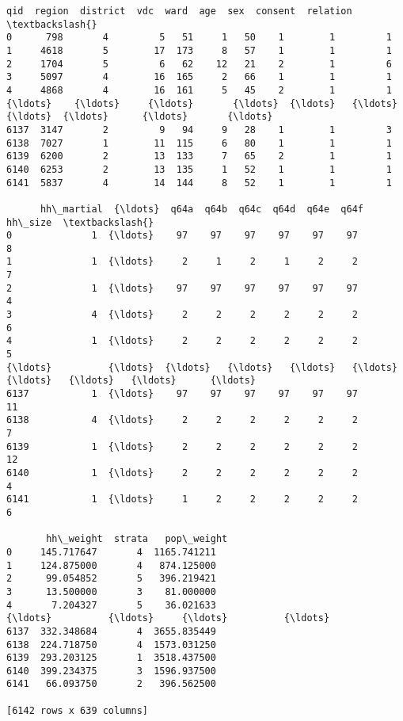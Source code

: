 \documentclass[11pt]{article}
\makeatletter
\newcommand{\boxspacing}{\kern\kvtcb@left@rule\kern\kvtcb@boxsep}
\newcommand{\prompt}[4]{
        {\ttfamily\llap{{\color{#2}[#3]:\hspace{3pt}#4}}\vspace{-\baselineskip}}
    }
\makeatother
\begin{document}
            \begin{tcolorbox}[breakable, size=fbox, boxrule=.5pt, pad at break*=1mm, opacityfill=0]
\prompt{Out}{outcolor}{3}{\boxspacing}
\begin{Verbatim}[commandchars=\\\{\}]
       qid  region  district  vdc  ward  age  sex  consent  relation  \textbackslash{}
0      798       4         5   51     1   50    1        1         1
1     4618       5        17  173     8   57    1        1         1
2     1704       5         6   62    12   21    2        1         6
3     5097       4        16  165     2   66    1        1         1
4     4868       4        16  161     5   45    2        1         1
{\ldots}    {\ldots}     {\ldots}       {\ldots}  {\ldots}   {\ldots}  {\ldots}  {\ldots}      {\ldots}       {\ldots}
6137  3147       2         9   94     9   28    1        1         3
6138  7027       1        11  115     6   80    1        1         1
6139  6200       2        13  133     7   65    2        1         1
6140  6253       2        13  135     1   52    1        1         1
6141  5837       4        14  144     8   52    1        1         1

      hh\_martial  {\ldots}  q64a  q64b  q64c  q64d  q64e  q64f  hh\_size  \textbackslash{}
0              1  {\ldots}    97    97    97    97    97    97        8
1              1  {\ldots}     2     1     2     1     2     2        7
2              1  {\ldots}    97    97    97    97    97    97        4
3              4  {\ldots}     2     2     2     2     2     2        6
4              1  {\ldots}     2     2     2     2     2     2        5
{\ldots}          {\ldots}  {\ldots}   {\ldots}   {\ldots}   {\ldots}   {\ldots}   {\ldots}   {\ldots}      {\ldots}
6137           1  {\ldots}    97    97    97    97    97    97       11
6138           4  {\ldots}     2     2     2     2     2     2        7
6139           1  {\ldots}     2     2     2     2     2     2       12
6140           1  {\ldots}     2     2     2     2     2     2        4
6141           1  {\ldots}     1     2     2     2     2     2        6

       hh\_weight  strata   pop\_weight
0     145.717647       4  1165.741211
1     124.875000       4   874.125000
2      99.054852       5   396.219421
3      13.500000       3    81.000000
4       7.204327       5    36.021633
{\ldots}          {\ldots}     {\ldots}          {\ldots}
6137  332.348684       4  3655.835449
6138  224.718750       4  1573.031250
6139  293.203125       1  3518.437500
6140  399.234375       3  1596.937500
6141   66.093750       2   396.562500

[6142 rows x 639 columns]
\end{Verbatim}
\end{tcolorbox}
        
\end{document}
